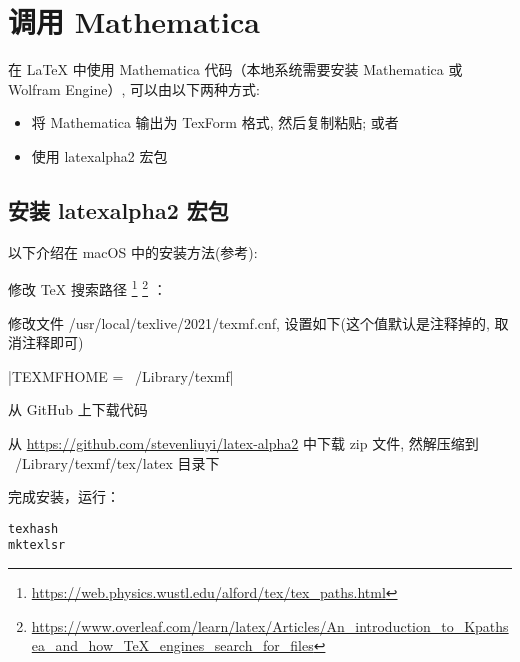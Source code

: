 \chapter{调用 Mathematica}

在 {\LaTeX} 中使用 Mathematica 代码（本地系统需要安装 Mathematica 或 Wolfram Engine）, 可以由以下两种方式:

\begin{itemize}
  \item 将 Mathematica 输出为 TexForm 格式, 然后复制粘贴; 或者
  \item 使用 latexalpha2 宏包
\end{itemize}

\section{安装 latexalpha2 宏包}

以下介绍在 macOS 中的安装方法(参考\cite{WIKIBOOKS}):

修改 {\TeX} 搜索路径
\footnote{\url{https://web.physics.wustl.edu/alford/tex/tex_paths.html}}
\footnote{\url{https://www.overleaf.com/learn/latex/Articles/An_introduction_to_Kpathsea_and_how_TeX_engines_search_for_files}}
：

修改文件 /usr/local/texlive/2021/texmf.cnf, 设置如下(这个值默认是注释掉的, 取消注释即可)

|TEXMFHOME = ~/Library/texmf|

从 GitHub 上下载代码

从 \url{https://github.com/stevenliuyi/latex-alpha2} 中下载 zip 文件, 然解压缩到 ~/Library/texmf/tex/latex 目录下 

完成安装，运行：

\begin{verbatim}
texhash
mktexlsr
\end{verbatim}







